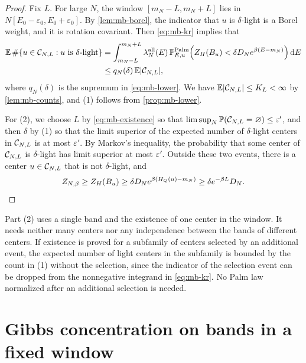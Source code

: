 \begin{proof}
Fix $L$. For large $N$, the window $[m_N-L,m_N+L]$ lies in $N[E_0-\varepsilon_0,E_0+\varepsilon_0]$. By \cref{lem:mb-borel}, the indicator that $u$ is $\delta$-light is a Borel weight, and it is rotation covariant. Then \eqref{eq:mb-kr} implies that
\[
\begin{aligned}
\mathbb E\,\#\{u\in\mathcal C_{N,L}:u\text{ is $\delta$-light}\}&=\int_{m_N-L}^{m_N+L}\lambda^{\mathrm{all}}_N(E)\,\mathbb P^{\mathrm{Palm}}_{E,u}\Bigl(Z_H(B_u)<\delta D_Ne^{\beta(E-m_N)}\Bigr)\,\mathrm d E\\
&\le q_N(\delta)\,\mathbb E|\mathcal C_{N,L}|,
\end{aligned}
\]
where $q_N(\delta)$ is the supremum in \eqref{eq:mb-lower}. We have $\mathbb E|\mathcal C_{N,L}|\le K_L<\infty$ by \cref{lem:mb-counts}, and (1) follows from \cref{prop:mb-lower}.

For (2), we choose $L$ by \eqref{eq:mb-existence} so that $\limsup_N\mathbb P(\mathcal C_{N,L}=\varnothing)\le\varepsilon'$, and then $\delta$ by (1) so that the limit superior of the expected number of $\delta$-light centers in $\mathcal C_{N,L}$ is at most $\varepsilon'$. By Markov's inequality, the probability that some center of $\mathcal C_{N,L}$ is $\delta$-light has limit superior at most $\varepsilon'$. Outside these two events, there is a center $u\in\mathcal C_{N,L}$ that is not $\delta$-light, and
\[
Z_{N,\beta}\ge Z_H(B_u)\ge\delta D_Ne^{\beta(H_Q(u)-m_N)}\ge\delta e^{-\beta L}D_N .\qedhere
\]
\end{proof}

Part (2) uses a single band and the existence of one center in the window. It needs neither many centers nor any independence between the bands of different centers. If existence is proved for a subfamily of centers selected by an additional event, the expected number of light centers in the subfamily is bounded by the count in (1) without the selection, since the indicator of the selection event can be dropped from the nonnegative integrand in \eqref{eq:mb-kr}. No Palm law normalized after an additional selection is needed.

\section{Gibbs concentration on bands in a fixed window}\label{sec:mb-capture}

